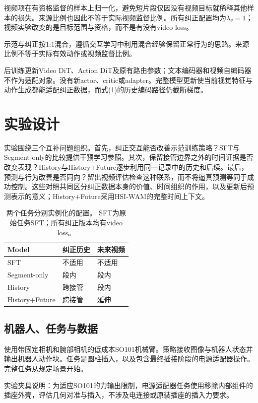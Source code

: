 \documentclass[letterpaper,10pt,conference]{ieeeconf}
\begin{document}
视频项在有资格监督的样本上归一化，避免短片段仅因没有视频目标就稀释其他样本的损失。来源比例也因此不等于实际视频监督比例。所有纠正配置均为$\lambda_v=1$；视频实验改变的是目标范围与资格，而不是有没有video loss。

示范与纠正按1:1混合，遵循交互学习中利用混合经验保留正常行为的思路\cite{iwr,sirius}。来源比例不等于实际有效动作或视频监督比例。

后训练更新Video DiT、Action DiT及原有路由参数；文本编码器和视频自编码器不作为适配对象。没有新actor、critic或adapter。完整模型更新使当前视觉特征与动作生成都能适配纠正数据，而式(1)的历史编码路径仍截断梯度。

\section{实验设计}

实验围绕三个互补问题组织。首先，纠正交互能否改善示范训练策略？SFT与Segment-only的比较提供干预学习参照。其次，保留接管边界之外的时间证据是否改变表现？History与History+Future逐步利用同一记录中的历史和后续。最后，预测与行为改善是否同向？留出视频评估检查这种联系，而不将逼真预测等同于成功控制。这些对照共同区分纠正数据本身的价值、时间组织的作用，以及更新后预测表示的意义；History+Future采用HSI-WAM的完整时间上下文。

\begin{table}[t]
\centering\small
\setlength{\tabcolsep}{3pt}
\caption{两个任务分别实例化的配置。 SFT为原始任务SFT；所有纠正版本均有video loss。}
\label{tab:configs}
\begin{tabular}{lll}
\toprule
Model & 纠正历史 & 未来视频 \\
\midrule
SFT & 不适用 & 不适用 \\
Segment-only & 段内 & 段内 \\
History & 跨接管 & 段内 \\
History+Future & 跨接管 & 延伸 \\
\bottomrule
\end{tabular}
\end{table}

\subsection{机器人、任务与数据}

使用带固定相机和腕部相机的低成本SO101机械臂。策略接收图像与机器人状态并输出机器人动作块。任务是圆柱插入，以及包含最终插接阶段的电源适配器操作。完整任务从规定场景开始。

实验夹具说明：为适应SO101的力输出限制，电源适配器任务使用移除内部组件的插座外壳，评估几何对准与插入，不涉及电连接或原装插座的插入力要求。
\end{document}
